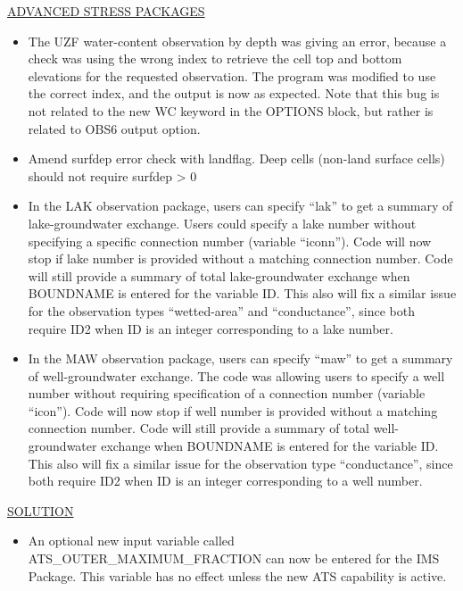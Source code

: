 	\underline{ADVANCED STRESS PACKAGES}
	\begin{itemize}
	        \item The UZF water-content observation by depth was giving an error, because a check was using the wrong index to retrieve the cell top and bottom elevations for the requested observation.  The program was modified to use the correct index, and the output is now as expected.  Note that this bug is not related to the new WC keyword in the OPTIONS block, but rather is related to OBS6 output option.
	        \item Amend surfdep error check with landflag.  Deep cells (non-land surface cells) should not require surfdep > 0
	        \item In the LAK observation package, users can specify ``lak'' to get a summary of lake-groundwater exchange.  Users could specify a lake number without specifying a specific connection number (variable ``iconn'').  Code will now stop if lake number is provided without a matching connection number.  Code will still provide a summary of total lake-groundwater exchange when BOUNDNAME is entered for the variable ID.  This also will fix a similar issue for the observation types ``wetted-area'' and ``conductance'', since both require ID2 when ID is an integer corresponding to a lake number.
	        \item In the MAW observation package, users can specify ``maw'' to get a summary of well-groundwater exchange.  The code was allowing users to specify a well number without requiring specification of a connection number (variable ``icon'').  Code will now stop if well number is provided without a matching connection number.  Code will still provide a summary of total well-groundwater exchange when BOUNDNAME is entered for the variable ID.  This also will fix a similar issue for the observation type ``conductance'', since both require ID2 when ID is an integer corresponding to a well number.
	\end{itemize}

	\underline{SOLUTION}
	\begin{itemize}
	        \item An optional new input variable called ATS\_OUTER\_MAXIMUM\_FRACTION can now be entered for the IMS Package.  This variable has no effect unless the new ATS capability is active.  
	\end{itemize}

